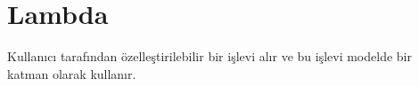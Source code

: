 \section{Lambda}
Kullanıcı tarafından özelleştirilebilir bir işlevi alır ve bu işlevi modelde bir katman olarak kullanır.

\newpage